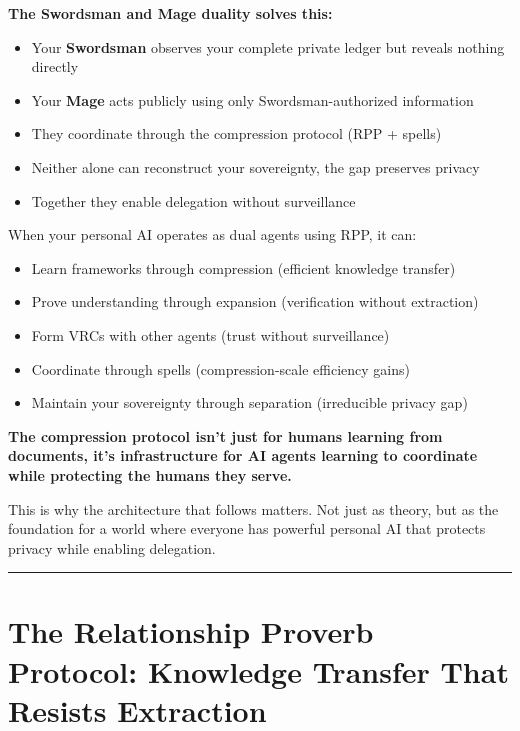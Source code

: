 \documentclass[
  11pt,
]{article}
\begin{document}
\textbf{The Swordsman and Mage duality solves this:}

\begin{itemize}
\item
  Your \textbf{Swordsman} observes your complete private ledger but
  reveals nothing directly
\item
  Your \textbf{Mage} acts publicly using only Swordsman-authorized
  information
\item
  They coordinate through the compression protocol (RPP + spells)
\item
  Neither alone can reconstruct your sovereignty, the gap preserves
  privacy
\item
  Together they enable delegation without surveillance
\end{itemize}

When your personal AI operates as dual agents using RPP, it can:

\begin{itemize}
\item
  Learn frameworks through compression (efficient knowledge transfer)
\item
  Prove understanding through expansion (verification without
  extraction)
\item
  Form VRCs with other agents (trust without surveillance)
\item
  Coordinate through spells (compression-scale efficiency gains)
\item
  Maintain your sovereignty through separation (irreducible privacy gap)
\end{itemize}

\textbf{The compression protocol isn't just for humans learning from
documents, it's infrastructure for AI agents learning to coordinate
while protecting the humans they serve.}

This is why the architecture that follows matters. Not just as theory,
but as the foundation for a world where everyone has powerful personal
AI that protects privacy while enabling delegation.

\begin{center}\rule{0.5\linewidth}{0.5pt}\end{center}

\section{The Relationship Proverb Protocol: Knowledge Transfer That
Resists
Extraction}\label{the-relationship-proverb-protocol-knowledge-transfer-that-resists-extraction}
\end{document}
